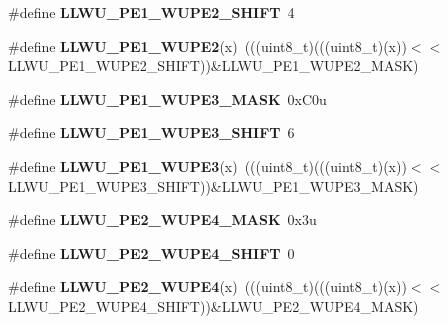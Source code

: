 \begin{DoxyCompactItemize}
\item 
\#define {\bfseries L\+L\+W\+U\+\_\+\+P\+E1\+\_\+\+W\+U\+P\+E2\+\_\+\+S\+H\+I\+FT}~4\hypertarget{group__LLWU__Register__Masks_ga0b1bb86eb31a82a18ad1491b0305000b}{}\label{group__LLWU__Register__Masks_ga0b1bb86eb31a82a18ad1491b0305000b}

\item 
\#define {\bfseries L\+L\+W\+U\+\_\+\+P\+E1\+\_\+\+W\+U\+P\+E2}(x)~(((uint8\+\_\+t)(((uint8\+\_\+t)(x))$<$$<$L\+L\+W\+U\+\_\+\+P\+E1\+\_\+\+W\+U\+P\+E2\+\_\+\+S\+H\+I\+FT))\&L\+L\+W\+U\+\_\+\+P\+E1\+\_\+\+W\+U\+P\+E2\+\_\+\+M\+A\+SK)\hypertarget{group__LLWU__Register__Masks_gae6a462624a848afff074ae6e6da83cb0}{}\label{group__LLWU__Register__Masks_gae6a462624a848afff074ae6e6da83cb0}

\item 
\#define {\bfseries L\+L\+W\+U\+\_\+\+P\+E1\+\_\+\+W\+U\+P\+E3\+\_\+\+M\+A\+SK}~0x\+C0u\hypertarget{group__LLWU__Register__Masks_ga44cae929b3178e210eb5e1346a4ce997}{}\label{group__LLWU__Register__Masks_ga44cae929b3178e210eb5e1346a4ce997}

\item 
\#define {\bfseries L\+L\+W\+U\+\_\+\+P\+E1\+\_\+\+W\+U\+P\+E3\+\_\+\+S\+H\+I\+FT}~6\hypertarget{group__LLWU__Register__Masks_gaceee1b1b6323ba4d33abf875718e885a}{}\label{group__LLWU__Register__Masks_gaceee1b1b6323ba4d33abf875718e885a}

\item 
\#define {\bfseries L\+L\+W\+U\+\_\+\+P\+E1\+\_\+\+W\+U\+P\+E3}(x)~(((uint8\+\_\+t)(((uint8\+\_\+t)(x))$<$$<$L\+L\+W\+U\+\_\+\+P\+E1\+\_\+\+W\+U\+P\+E3\+\_\+\+S\+H\+I\+FT))\&L\+L\+W\+U\+\_\+\+P\+E1\+\_\+\+W\+U\+P\+E3\+\_\+\+M\+A\+SK)\hypertarget{group__LLWU__Register__Masks_ga3dfb03917664cd276f352b77e95624b9}{}\label{group__LLWU__Register__Masks_ga3dfb03917664cd276f352b77e95624b9}

\item 
\#define {\bfseries L\+L\+W\+U\+\_\+\+P\+E2\+\_\+\+W\+U\+P\+E4\+\_\+\+M\+A\+SK}~0x3u\hypertarget{group__LLWU__Register__Masks_ga94128d26c60f13d22acf47200f4f37e0}{}\label{group__LLWU__Register__Masks_ga94128d26c60f13d22acf47200f4f37e0}

\item 
\#define {\bfseries L\+L\+W\+U\+\_\+\+P\+E2\+\_\+\+W\+U\+P\+E4\+\_\+\+S\+H\+I\+FT}~0\hypertarget{group__LLWU__Register__Masks_ga12aa6ffb998e5273a8dd548ac434ad41}{}\label{group__LLWU__Register__Masks_ga12aa6ffb998e5273a8dd548ac434ad41}

\item 
\#define {\bfseries L\+L\+W\+U\+\_\+\+P\+E2\+\_\+\+W\+U\+P\+E4}(x)~(((uint8\+\_\+t)(((uint8\+\_\+t)(x))$<$$<$L\+L\+W\+U\+\_\+\+P\+E2\+\_\+\+W\+U\+P\+E4\+\_\+\+S\+H\+I\+FT))\&L\+L\+W\+U\+\_\+\+P\+E2\+\_\+\+W\+U\+P\+E4\+\_\+\+M\+A\+SK)\hypertarget{group__LLWU__Register__Masks_gadd7ab2866ab9683237ee5d6c003cf2aa}{}\label{group__LLWU__Register__Masks_gadd7ab2866ab9683237ee5d6c003cf2aa}


\end{DoxyCompactItemize}
